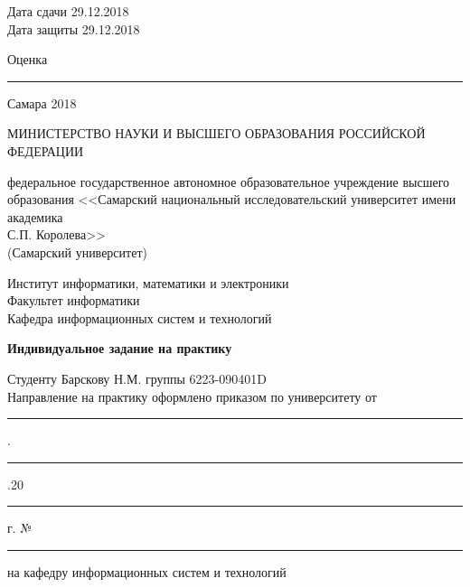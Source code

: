 \documentclass[a4paper, 12pt]{extreport}
\begin{document}
    \noindent Дата сдачи 29.12.2018 \\
    \noindent Дата защиты 29.12.2018
    \vspace{12pt}

    \noindent Оценка \rule{}{0.4pt}
    \vfill

    \begin{center}
        \noindent Самара 2018
    \end{center}
    \newpage
    \tableofcontents
    \newpage
    \begin{center}
        МИНИСТЕРСТВО НАУКИ И ВЫСШЕГО ОБРАЗОВАНИЯ РОССИЙСКОЙ ФЕДЕРАЦИИ
        \vspace{14pt}

        федеральное государственное автономное образовательное учреждение высшего \\ образования
        <<Самарский национальный исследовательский университет имени академика \\ С.П. Королева>> \\
        (Самарский университет)
        \vspace{14pt}

        Институт информатики, математики и электроники \\
        Факультет информатики \\
        Кафедра информационных систем и технологий
        \vspace{70pt}

        \textbf{Индивидуальное задание на практику}
        \vspace{14pt}
    \end{center}

    \noindent Студенту Барскову Н.М. группы 6223-090401D \\
    Направление на практику оформлено приказом по университету от
    \rule{}{0.4pt}.\rule{}{0.4pt}.20\rule{}{0.4pt} г.
    №\rule{}{0.4pt} на кафедру информационных систем и технологий
\end{document}
